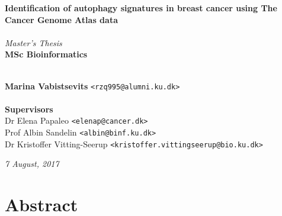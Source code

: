 \documentclass[10pt, openright,oneside]{book}
\begin{document}
\frontmatter
    \thispagestyle{empty}
    
    \vspace*{4.5cm} 
    \noindent \textbf{\huge Identification of autophagy signatures in breast cancer using The Cancer Genome Atlas data} \\
    \\[0.5cm]
    \textit{\Large Master's Thesis} \\
    [0.5cm]
    \textbf{\Large MSc Bioinformatics} \\
    \vspace*{.1cm} \\
    \begin{tabbing}
    \textbf{Marina Vabistsevits} \hspace{1cm} \= \texttt{<rzq995@alumni.ku.dk>} \\
    \\[9cm]
    \textbf{\Large Supervisors} \\
    Dr Elena Papaleo \> \texttt{<elenap@cancer.dk>} \\
    Prof Albin Sandelin \> \texttt{<albin@binf.ku.dk>} \\
    Dr Kristoffer Vitting-Seerup\> \texttt{<kristoffer.vittingseerup@bio.ku.dk>}
    \\[1cm]
    
    \end{tabbing}
    \begin{center}
    \textit{7 August, 2017} 
    \end{center}

    \newpage
    \ClearWallPaper
    



\pagestyle{plain}


\frontmatter

\chapter{Abstract}

\end{document}
